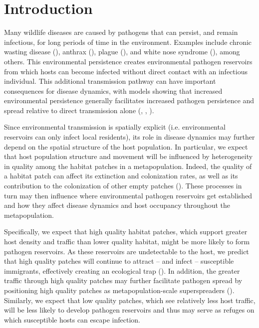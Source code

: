 \documentclass{article}
\begin{document}
\section{Introduction}
\label{intro}

Many wildlife diseases are caused by pathogens that can persist, and remain infectious, for long periods of time in the environment.  Examples include chronic wasting disease (\cite{Miller2006}), anthrax (\cite{Dragon1995}), plague (\cite{Eisen2008}), and white nose syndrome (\cite{Lindner2011}), among others.  This environmental persistence creates environmental pathogen reservoirs from which hosts can become infected without direct contact with an infectious individual.  This additional transmission pathway can have important consequences for disease dynamics, with models showing that increased environmental persistence generally facilitates increased pathogen persistence and spread relative to direct transmission alone (\cite{Almberg2011}, \cite{Sharp2011}, \cite{Breban2009}). 

Since environmental transmission is spatially explicit (i.e. environmental reservoirs can only infect local residents), its role in disease dynamics may further depend on the spatial structure of the host population.  In particular, we expect that host population structure and movement will be influenced by heterogeneity in quality among the habitat patches in a metapopulation.  Indeed, the quality of a habitat patch can affect its extinction and colonization rates, as well as its contribution to the colonization of other empty patches (\cite{Moilanen1998}).  These processes in turn may then influence where environmental pathogen reservoirs get established and how they affect disease dynamics and host occupancy throughout the metapopulation.  

Specifically, we expect that high quality habitat patches, which support greater host density and traffic than lower quality habitat, might be more likely to form pathogen reservoirs.  As these reservoirs are undetectable to the host, we predict that high quality patches will continue to attract -- and infect -- susceptible immigrants, effectively creating an ecological trap (\cite{Almberg2011}).  In addition, the greater traffic through high quality patches may further facilitate pathogen spread by positioning high quality patches as metapopulation-scale superspreaders (\cite{Paull2012}).  Similarly, we expect that low quality patches, which see relatively less host traffic, will be less likely to develop pathogen reservoirs and thus may serve as refuges on which susceptible hosts can escape infection.  
\end{document}
